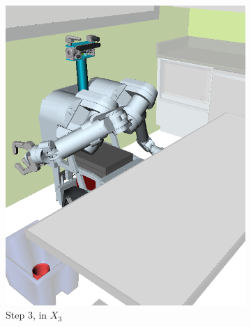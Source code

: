 \begin{figure}
\begin{widepage}
\begin{subfigure}[t]{0.185\linewidth}
\includegraphics[width=\columnwidth]{figs/testherb-d.png}
\caption{Step 3, in $X_3$}
\end{subfigure}
\begin{subfigure}[t]{0.185\linewidth}
\centering

\end{subfigure}
\end{widepage}
\end{figure}
